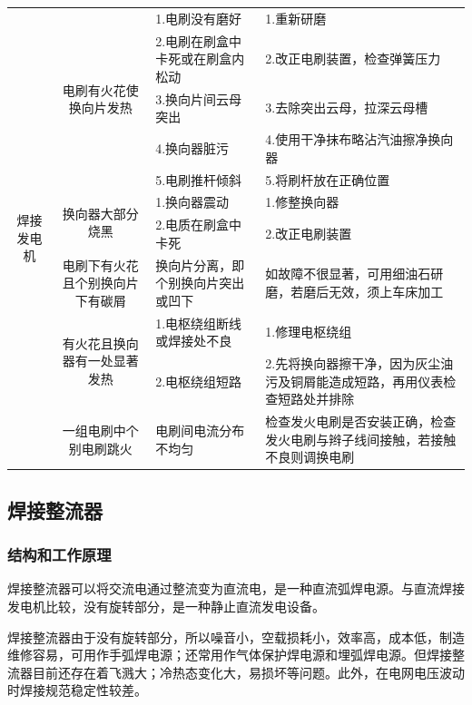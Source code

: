 \documentclass{ctexbook}
\begin{document}
\begin{table}[htbp]
\begin{tabular}{c|c|l|l}
		\midrule
		\multirow{11}[22]{*}{焊接发电机} & \multirow{5}[10]{*}{电刷有火花使换向片发热} & 1.电刷没有磨好 & 1.重新研磨 \\
		\cmidrule{3-4}          &       & 2.电刷在刷盒中卡死或在刷盒内松动 & 2.改正电刷装置，检查弹簧压力 \\
		\cmidrule{3-4}          &       & 3.换向片间云母突出 & 3.去除突出云母，拉深云母槽 \\
		\cmidrule{3-4}          &       & 4.换向器脏污 & 4.使用干净抹布略沾汽油擦净换向器 \\
		\cmidrule{3-4}          &       & 5.电刷推杆倾斜 & 5.将刷杆放在正确位置 \\
		\cmidrule{2-4}          & \multirow{2}[4]{*}{换向器大部分烧黑} & 1.换向器震动 & 1.修整换向器 \\
		\cmidrule{3-4}          &       & 2.电质在刷盒中卡死 & 2.改正电刷装置 \\
		\cmidrule{2-4}          & 电刷下有火花且个别换向片下有碳屑 & 换向片分离，即个别换向片突出或凹下 & 如故障不很显著，可用细油石研磨，若磨后无效，须上车床加工 \\
		\cmidrule{2-4}          & \multirow{2}[4]{*}{有火花且换向器有一处显著发热} & 1.电枢绕组断线或焊接处不良 & 1.修理电枢绕组 \\
		\cmidrule{3-4}          &       & 2.电枢绕组短路 & 2.先将换向器擦干净，因为灰尘油污及铜屑能造成短路，再用仪表检查短路处并排除 \\
		\cmidrule{2-4}          & 一组电刷中个别电刷跳火 & 电刷间电流分布不均匀 & 检查发火电刷是否安装正确，检查发火电刷与辫子线间接触，若接触不良则调换电刷 \\
		\bottomrule
	\end{tabular}%
	\label{tab:zhiliuhanjiguzhang}%
\end{table}%
\subsection{焊接整流器}
\subsubsection{结构和工作原理}
焊接整流器可以将交流电通过整流变为直流电，是一种直流弧焊电源。与直流焊接发电机比较，没有旋转部分，是一种静止直流发电设备。

焊接整流器由于没有旋转部分，所以噪音小，空载损耗小，效率高，成本低，制造维修容易，可用作手弧焊电源；还常用作气体保护焊电源和埋弧焊电源。但焊接整流器目前还存在着飞溅大；冷热态变化大，易损坏等问题。此外，在电网电压波动时焊接规范稳定性较差。
\end{document}
